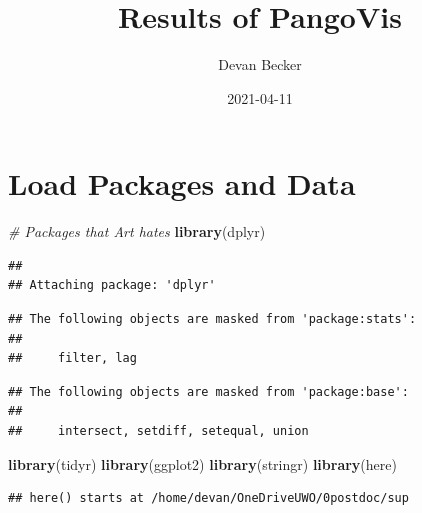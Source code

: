 \documentclass[
]{article}
\title{Results of PangoVis}
\author{Devan Becker}
\date{2021-04-11}
\newenvironment{Shaded}{\begin{snugshade}}{\end{snugshade}}
\newcommand{\CommentTok}[1]{\textcolor[rgb]{0.56,0.35,0.01}{\textit{#1}}}
\newcommand{\KeywordTok}[1]{\textcolor[rgb]{0.13,0.29,0.53}{\textbf{#1}}}
\newcommand{\NormalTok}[1]{#1}
\begin{document}
\maketitle

\hypertarget{load-packages-and-data}{%
\section{Load Packages and Data}\label{load-packages-and-data}}

\begin{Shaded}
\begin{Highlighting}[]
\CommentTok{\# Packages that Art hates}
\KeywordTok{library}\NormalTok{(dplyr)}
\end{Highlighting}
\end{Shaded}

\begin{verbatim}
## 
## Attaching package: 'dplyr'
\end{verbatim}

\begin{verbatim}
## The following objects are masked from 'package:stats':
## 
##     filter, lag
\end{verbatim}

\begin{verbatim}
## The following objects are masked from 'package:base':
## 
##     intersect, setdiff, setequal, union
\end{verbatim}

\begin{Shaded}
\begin{Highlighting}[]
\KeywordTok{library}\NormalTok{(tidyr)}
\KeywordTok{library}\NormalTok{(ggplot2)}
\KeywordTok{library}\NormalTok{(stringr)}
\KeywordTok{library}\NormalTok{(here)}
\end{Highlighting}
\end{Shaded}

\begin{verbatim}
## here() starts at /home/devan/OneDriveUWO/0postdoc/sup
\end{verbatim}
\end{document}
